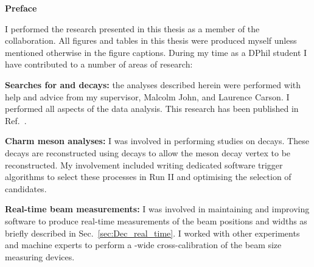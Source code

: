 \begin{alwayssingle} 
 \thispagestyle{empty}
 \begin{center}
   \vspace*{1.5cm}
   {\Large \bfseries  Preface}
 \end{center}
 \vspace{0.5cm}
 I performed the research presented in this thesis as a member of the \lhcb collaboration. All figures and tables in this thesis were produced myself unless mentioned otherwise in the figure captions.  
During my time as a DPhil student I have contributed to a number of areas of research: 
 \begin{description}
 \item \textbf{Searches for \decay{\Bp}{\Dsp\phiz} and \decay{\Bp}{\Dsp\Kp\Km} decays:} the analyses described herein were performed with help and advice from my supervisor, Malcolm John, and Laurence Carson. I performed all aspects of the data analysis. This research has been published in Ref.~\cite{LHCb-PAPER-2017-032}.

 \item \textbf{Charm meson analyses:} I was involved in performing studies on \decay{\Dp}{\pip\piz} decays. These decays are reconstructed using \decay{\piz}{\ep\en\Pgamma} decays to allow the \Dp meson decay vertex to be reconstructed. My involvement included writing dedicated software trigger algorithms to select these processes in Run II and optimising the selection of candidates.  

 \item \textbf{Real-time beam measurements:} I was involved in maintaining and improving software to produce real-time measurements of the \lhc beam positions and widths as briefly described in Sec.~\ref{sec:Dec_real_time}. I worked with other experiments and \lhc machine experts to perform a \lhc-wide cross-calibration of the beam size measuring devices.  


 \end{description}

\end{alwayssingle}



